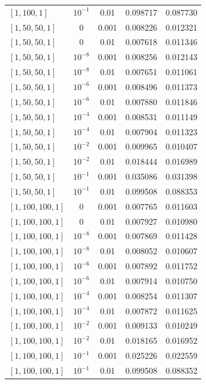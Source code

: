 \documentclass[aps,rmp,reprint,amsmath,amssymb,graphicx,longbibliography]{revtex4-1}
\begin{document}
\begin{table}[p]
\begin{ruledtabular}
\begin{tabular}{lccrr}
$[1,100,1]$ & $10^{-1}$ & 0.01 & 0.098717 & 0.087730 \\
$[1,50,50,1]$ & $0$ & 0.001 & 0.008226 & 0.012321 \\
$[1,50,50,1]$ & $0$ & 0.01 & 0.007618 & 0.011346 \\
$[1,50,50,1]$ & $10^{-8}$ & 0.001 & 0.008256 & 0.012143 \\
$[1,50,50,1]$ & $10^{-8}$ & 0.01 & 0.007651 & 0.011061 \\
$[1,50,50,1]$ & $10^{-6}$ & 0.001 & 0.008496 & 0.011373 \\
$[1,50,50,1]$ & $10^{-6}$ & 0.01 & 0.007880 & 0.011846 \\
$[1,50,50,1]$ & $10^{-4}$ & 0.001 & 0.008531 & 0.011149 \\
$[1,50,50,1]$ & $10^{-4}$ & 0.01 & 0.007904 & 0.011323 \\
$[1,50,50,1]$ & $10^{-2}$ & 0.001 & 0.009965 & 0.010407 \\
$[1,50,50,1]$ & $10^{-2}$ & 0.01 & 0.018444 & 0.016989 \\
$[1,50,50,1]$ & $10^{-1}$ & 0.001 & 0.035086 & 0.031398 \\
$[1,50,50,1]$ & $10^{-1}$ & 0.01 & 0.099508 & 0.088353 \\
$[1,100,100,1]$ & $0$ & 0.001 & 0.007765 & 0.011603 \\
$[1,100,100,1]$ & $0$ & 0.01 & 0.007927 & 0.010980 \\
$[1,100,100,1]$ & $10^{-8}$ & 0.001 & 0.007869 & 0.011428 \\
$[1,100,100,1]$ & $10^{-8}$ & 0.01 & 0.008052 & 0.010607 \\
$[1,100,100,1]$ & $10^{-6}$ & 0.001 & 0.007892 & 0.011752 \\
$[1,100,100,1]$ & $10^{-6}$ & 0.01 & 0.007914 & 0.010750 \\
$[1,100,100,1]$ & $10^{-4}$ & 0.001 & 0.008254 & 0.011307 \\
$[1,100,100,1]$ & $10^{-4}$ & 0.01 & 0.007872 & 0.011625 \\
$[1,100,100,1]$ & $10^{-2}$ & 0.001 & 0.009133 & 0.010249 \\
$[1,100,100,1]$ & $10^{-2}$ & 0.01 & 0.018165 & 0.016952 \\
$[1,100,100,1]$ & $10^{-1}$ & 0.001 & 0.025226 & 0.022559 \\
$[1,100,100,1]$ & $10^{-1}$ & 0.01 & 0.099508 & 0.088352 \\
\end{tabular}
\end{ruledtabular}
\end{table}
\end{document}
